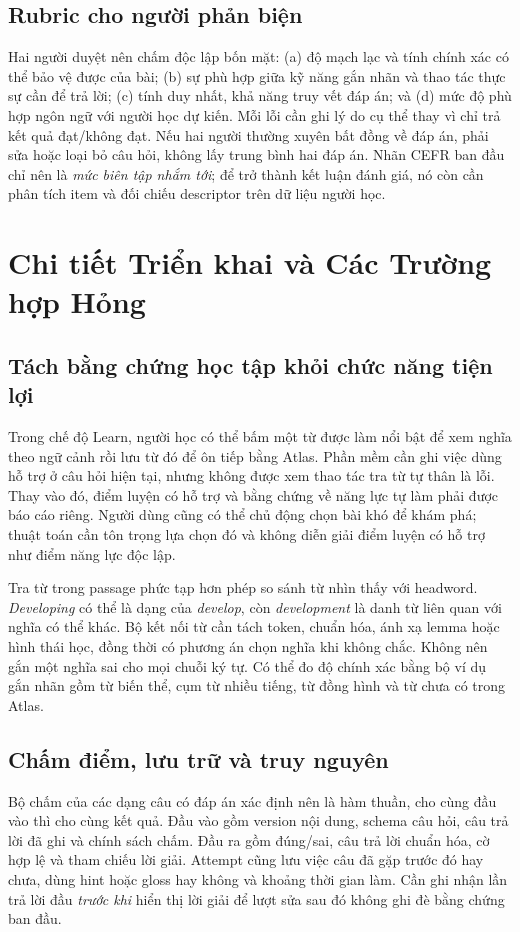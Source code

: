\documentclass[conference,10pt]{IEEEtran}
\begin{document}
\subsection{Rubric cho người phản biện}
Hai người duyệt nên chấm độc lập bốn mặt: (a) độ mạch lạc và tính chính xác có thể bảo vệ được của bài; (b) sự phù hợp giữa kỹ năng gắn nhãn và thao tác thực sự cần để trả lời; (c) tính duy nhất, khả năng truy vết đáp án; và (d) mức độ phù hợp ngôn ngữ với người học dự kiến. Mỗi lỗi cần ghi lý do cụ thể thay vì chỉ trả kết quả đạt/không đạt. Nếu hai người thường xuyên bất đồng về đáp án, phải sửa hoặc loại bỏ câu hỏi, không lấy trung bình hai đáp án. Nhãn CEFR ban đầu chỉ nên là \emph{mức biên tập nhắm tới}; để trở thành kết luận đánh giá, nó còn cần phân tích item và đối chiếu descriptor trên dữ liệu người học.

\section{Chi tiết Triển khai và Các Trường hợp Hỏng}
\subsection{Tách bằng chứng học tập khỏi chức năng tiện lợi}
Trong chế độ Learn, người học có thể bấm một từ được làm nổi bật để xem nghĩa theo ngữ cảnh rồi lưu từ đó để ôn tiếp bằng Atlas. Phần mềm cần ghi việc dùng hỗ trợ ở câu hỏi hiện tại, nhưng không được xem thao tác tra từ tự thân là lỗi. Thay vào đó, điểm luyện có hỗ trợ và bằng chứng về năng lực tự làm phải được báo cáo riêng. Người dùng cũng có thể chủ động chọn bài khó để khám phá; thuật toán cần tôn trọng lựa chọn đó và không diễn giải điểm luyện có hỗ trợ như điểm năng lực độc lập.

Tra từ trong passage phức tạp hơn phép so sánh từ nhìn thấy với headword. \emph{Developing} có thể là dạng của \emph{develop}, còn \emph{development} là danh từ liên quan với nghĩa có thể khác. Bộ kết nối từ cần tách token, chuẩn hóa, ánh xạ lemma hoặc hình thái học, đồng thời có phương án chọn nghĩa khi không chắc. Không nên gắn một nghĩa sai cho mọi chuỗi ký tự. Có thể đo độ chính xác bằng bộ ví dụ gắn nhãn gồm từ biến thể, cụm từ nhiều tiếng, từ đồng hình và từ chưa có trong Atlas.

\subsection{Chấm điểm, lưu trữ và truy nguyên}
Bộ chấm của các dạng câu có đáp án xác định nên là hàm thuần, cho cùng đầu vào thì cho cùng kết quả. Đầu vào gồm version nội dung, schema câu hỏi, câu trả lời đã ghi và chính sách chấm. Đầu ra gồm đúng/sai, câu trả lời chuẩn hóa, cờ hợp lệ và tham chiếu lời giải. Attempt cũng lưu việc câu đã gặp trước đó hay chưa, dùng hint hoặc gloss hay không và khoảng thời gian làm. Cần ghi nhận lần trả lời đầu \emph{trước khi} hiển thị lời giải để lượt sửa sau đó không ghi đè bằng chứng ban đầu.
\end{document}
